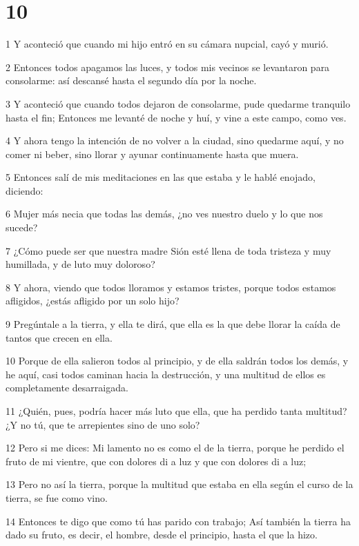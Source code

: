 \chapter{10}

\par 1 Y aconteció que cuando mi hijo entró en su cámara nupcial, cayó y murió.
\par 2 Entonces todos apagamos las luces, y todos mis vecinos se levantaron para consolarme: así descansé hasta el segundo día por la noche.
\par 3 Y aconteció que cuando todos dejaron de consolarme, pude quedarme tranquilo hasta el fin; Entonces me levanté de noche y huí, y vine a este campo, como ves.
\par 4 Y ahora tengo la intención de no volver a la ciudad, sino quedarme aquí, y no comer ni beber, sino llorar y ayunar continuamente hasta que muera.
\par 5 Entonces salí de mis meditaciones en las que estaba y le hablé enojado, diciendo:
\par 6 Mujer más necia que todas las demás, ¿no ves nuestro duelo y lo que nos sucede?
\par 7 ¿Cómo puede ser que nuestra madre Sión esté llena de toda tristeza y muy humillada, y de luto muy doloroso?
\par 8 Y ahora, viendo que todos lloramos y estamos tristes, porque todos estamos afligidos, ¿estás afligido por un solo hijo?
\par 9 Pregúntale a la tierra, y ella te dirá, que ella es la que debe llorar la caída de tantos que crecen en ella.
\par 10 Porque de ella salieron todos al principio, y de ella saldrán todos los demás, y he aquí, casi todos caminan hacia la destrucción, y una multitud de ellos es completamente desarraigada.
\par 11 ¿Quién, pues, podría hacer más luto que ella, que ha perdido tanta multitud? ¿Y no tú, que te arrepientes sino de uno solo?
\par 12 Pero si me dices: Mi lamento no es como el de la tierra, porque he perdido el fruto de mi vientre, que con dolores di a luz y que con dolores di a luz;
\par 13 Pero no así la tierra, porque la multitud que estaba en ella según el curso de la tierra, se fue como vino.
\par 14 Entonces te digo que como tú has parido con trabajo; Así también la tierra ha dado su fruto, es decir, el hombre, desde el principio, hasta el que la hizo.
